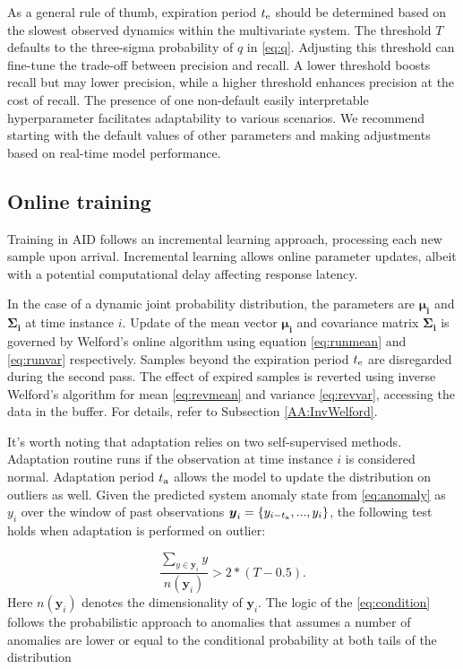 As a general rule of thumb, expiration period $t _{\text{e}}$ should be determined based on the slowest observed dynamics within the multivariate system. The threshold $T$ defaults to the three-sigma probability of $q$ in \eqref{eq:q}. Adjusting this threshold can fine-tune the trade-off between precision and recall. A lower threshold boosts recall but may lower precision, while a higher threshold enhances precision at the cost of recall. The presence of one non-default easily interpretable hyperparameter facilitates adaptability to various scenarios. We recommend starting with the default values of other parameters and making adjustments based on real-time model performance.

\subsection{Online training}\label{train}
Training in AID follows an incremental learning approach, processing each new sample upon arrival. Incremental learning allows online parameter updates, albeit with a potential computational delay affecting response latency.

In the case of a dynamic joint probability distribution, the parameters are $\boldsymbol{\mu_i}$ and $\boldsymbol{\Sigma_i}$ at time instance \(i\). Update of the mean vector $\boldsymbol{\mu_i}$ and covariance matrix $\boldsymbol{\Sigma_i}$ is governed by Welford's online algorithm using equation \eqref{eq:runmean} and \eqref{eq:runvar} respectively. Samples beyond the expiration period $t _{\text{e}}$ are disregarded during the second pass. The effect of expired samples is reverted using inverse Welford's algorithm for mean \eqref{eq:revmean} and variance \eqref{eq:revvar}, accessing the data in the buffer. For details, refer to Subsection \ref{AA:InvWelford}.

It's worth noting that adaptation relies on two self-supervised methods. Adaptation routine runs if the observation at time instance \(i\) is considered normal. Adaptation period $t _{\text{a}}$ allows the model to update the distribution on outliers as well. Given the predicted system anomaly state from \eqref{eq:anomaly} as $y_i$ over the window of past observations \(\boldsymbol{y}_i=\{y_{i-t _{\text{a}}},...,y_{i}\}\), the following test holds when adaptation is performed on outlier:

\begin{equation}
  {\frac{\sum_{y\in \boldsymbol{y}_i}y}{n(\boldsymbol{y}_i)}} > 2*(T-0.5)\text{.}\label{eq:condition}
\end{equation}
Here \(n(\boldsymbol{y}_i)\) denotes the dimensionality of \(\boldsymbol{y}_i\). The logic of the \eqref{eq:condition} follows the probabilistic approach to anomalies that assumes a number of anomalies are lower or equal to the conditional probability at both tails of the distribution

